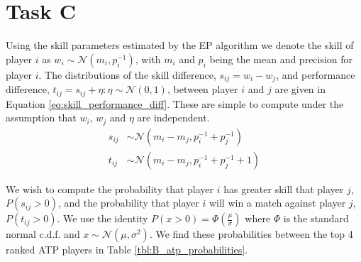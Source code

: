 \documentclass[11pt]{article}
\begin{document}
\section{Task C}

Using the skill parameters estimated by the EP algorithm we denote the skill of player $i$ as $w_i \sim \mathcal{N}(m_i, p_i^{-1})$, with $m_i$ and $p_i$ being the mean and precision for player $i$. The distributions of the skill difference, $s_{ij} = w_i - w_j$, and performance difference, $t_{ij} = s_{ij} + \eta : \eta \sim \mathcal{N}(0, 1)$, between player $i$ and $j$ are given in Equation \ref{eq:skill_performance_diff}. These are simple to compute under the assumption that $w_i$, $w_j$ and $\eta$ are independent.
\begin{equation}
\begin{split}
    s_{ij} &\sim \mathcal{N}(m_i - m_j, p_i^{-1} + p_j^{-1}) \\
    t_{ij} &\sim \mathcal{N}(m_i - m_j, p_i^{-1} + p_j^{-1} + 1)
\end{split}
\label{eq:skill_performance_diff}
\end{equation}

We wish to compute the probability that player $i$ has greater skill that player $j$, $P(s_{ij}>0)$, and the probability that player $i$ will win a match against player $j$, $P(t_{ij}>0)$. We use the identity $P(x>0) = \Phi(\frac{\mu}{\sigma})$ where $\Phi$ is the standard normal c.d.f. and $x \sim \mathcal{N}(\mu, \sigma^2)$. We find these probabilities between the top 4 ranked ATP players in Table \ref{tbl:B_atp_probabilities}.
\end{document}
